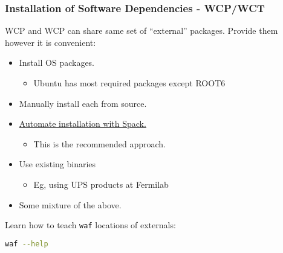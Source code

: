 \documentclass[xcolor=dvipsnames]{beamer}
\begin{document}
\begin{frame}[fragile]
  \frametitle{Installation of Software Dependencies - WCP/WCT}

  WCP and WCP can share same set of ``external'' packages.  Provide
  them however it is convenient:

  \begin{itemize}
  \item Install OS packages.
    \begin{itemize}\footnotesize
    \item Ubuntu has most required packages except ROOT6
    \end{itemize}
  \item Manually install each from source.
  \item \href{https://github.com/wirecell/wire-cell-spack}{Automate installation with Spack.}
    \begin{itemize}\footnotesize
    \item This is the recommended approach.
    \end{itemize}
  \item Use existing binaries
    \begin{itemize}\footnotesize
    \item Eg, using UPS products at Fermilab
    \end{itemize}
  \item Some mixture of the above.
  \end{itemize}

Learn how to teach \texttt{waf} locations of externals:
\begin{lstlisting}[language=sh]
waf --help
\end{lstlisting}
  
\end{frame}
\end{document}

